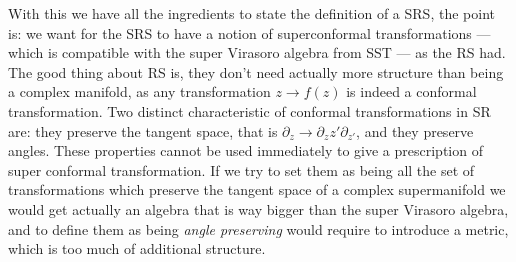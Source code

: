 With this we have all the ingredients to state the definition of a SRS, the point is: we want for the SRS to have a notion 
of superconformal transformations --- which is compatible with the super Virasoro algebra from SST --- as the RS had. The good thing about RS is, they don't need actually more structure than 
being a complex manifold, as any transformation $z\rightarrow f(z)$ is indeed a conformal transformation. Two 
distinct characteristic of conformal transformations in SR are: they preserve the tangent space, that is 
$\partial_z\rightarrow\partial_z z'\partial_{z'}$, and they preserve angles. These properties cannot be 
used immediately to give a prescription of super conformal transformation. If we try to set them as being 
all the set of transformations which preserve the tangent space of a complex supermanifold we would 
get actually an algebra that is way bigger than the super Virasoro algebra, and to define them as being 
\textit{angle preserving} would require to introduce a metric, which is too much of additional structure.

